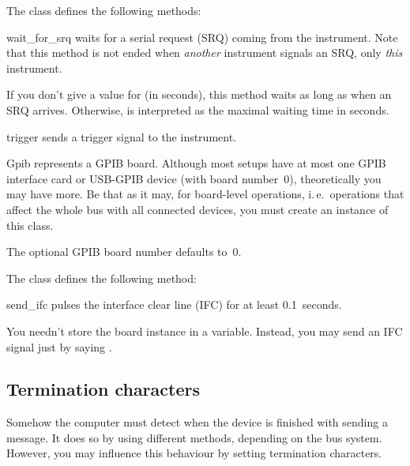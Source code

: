 \documentclass{howto}
\begin{document}
The class  defines the following methods:

\begin{methoddesc}{wait_for_srq}{}
  waits for a serial request (SRQ) coming from the instrument.  Note that this
  method is not ended when \emph{another} instrument signals an SRQ, only
  \emph{this} instrument.
  
  If you don't give a value for  (in seconds), this method waits
  as long as when an SRQ arrives.  Otherwise,  is interpreted as
  the maximal waiting time in seconds.
\end{methoddesc}

\begin{methoddesc}{trigger}{}
  sends a trigger signal to the instrument.
\end{methoddesc}

\bigskip
\begin{classdesc}{Gpib}{}
  represents a GPIB board.  Although most setups have at most one GPIB
  interface card or USB-GPIB device (with board number~0), theoretically you
  may have more.  Be that as it may, for board-level operations, i.\,e.\
  operations that affect the whole bus with all connected devices, you must
  create an instance of this class.

  The optional GPIB board number  defaults to~0.
\end{classdesc}

The class  defines the following method:

\begin{methoddesc}{send_ifc}{}
  pulses the interface clear line (IFC) for at least 0.1~seconds.
\end{methoddesc}

\begin{notice}
You needn't store the board instance in a variable.  Instead, you may send an
IFC signal just by saying \samp{Gpib().send_ifc()}.
\end{notice}


\subsection{Termination characters}
\label{sec:termchars}

Somehow the computer must detect when the device is finished with sending a
message.  It does so by using different methods, depending on the bus system.
However, you may influence this behaviour by setting termination characters.
\end{document}
